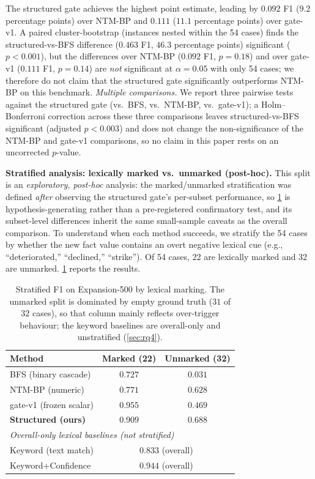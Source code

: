 \documentclass{article}
\theoremstyle{definition}
\begin{document}
The structured gate achieves the highest point estimate, leading by
$0.092$ F1 ($9.2$ percentage points) over NTM-BP and $0.111$ ($11.1$
percentage points) over gate-v1.  A paired cluster-bootstrap (instances
nested within the 54 cases) finds the structured-vs-BFS difference
($0.463$ F1, $46.3$ percentage points) significant ($p<0.001$), but the
differences over NTM-BP ($0.092$ F1, $p=0.18$) and over gate-v1
($0.111$ F1, $p=0.14$) are \emph{not} significant at
$\alpha=0.05$ with only 54 cases; we therefore do not claim that the
structured gate significantly outperforms NTM-BP on this benchmark.
\emph{Multiple comparisons.}  We report three pairwise tests against
the structured gate (vs.\ BFS, vs.\ NTM-BP, vs.\ gate-v1); a
Holm--Bonferroni correction across these three comparisons leaves
structured-vs-BFS significant (adjusted $p<0.003$) and does not change
the non-significance of the NTM-BP and gate-v1 comparisons, so no claim in
this paper rests on an uncorrected $p$-value.

\textbf{Stratified analysis: lexically marked vs.\ unmarked (post-hoc).}
This split is an \emph{exploratory, post-hoc} analysis: the
marked/unmarked stratification was defined \emph{after} observing the
structured gate's per-subset performance, so \cref{tab:stratified} is
hypothesis-generating rather than a pre-registered confirmatory test,
and its subset-level differences inherit the same small-sample caveats
as the overall comparison.  To understand when each method succeeds, we
stratify the 54 cases by whether the new fact value contains an overt
negative lexical cue (e.g., ``deteriorated,'' ``declined,''
``strike'').  Of 54 cases, 22 are lexically marked and 32 are unmarked.
\cref{tab:stratified} reports the results.

\begin{table}[t]
\centering
\caption{Stratified F1 on Expansion-500 by lexical marking.  The
  unmarked split is dominated by empty ground truth ($31$ of $32$ cases),
  so that column mainly reflects over-trigger behaviour; the keyword
  baselines are overall-only and unstratified (\cref{sec:rq4}).}
\label{tab:stratified}
\begin{tabular}{lcc}
\toprule
Method & Marked (22) & Unmarked (32) \\
\midrule
BFS (binary cascade)        & $0.727$ & $0.031$ \\
NTM-BP (numeric)            & $0.771$ & $0.628$ \\
gate-v1 (frozen scalar)     & $0.955$ & $0.469$ \\
\textbf{Structured (ours)}  & $0.909$ & $\mathbf{0.688}$ \\
\midrule
\multicolumn{3}{l}{\emph{Overall-only lexical baselines (not stratified)}} \\
Keyword (text match)        & \multicolumn{2}{c}{$0.833$ (overall)} \\
Keyword+Confidence          & \multicolumn{2}{c}{$0.944$ (overall)} \\
\bottomrule
\end{tabular}
\end{table}
\end{document}
